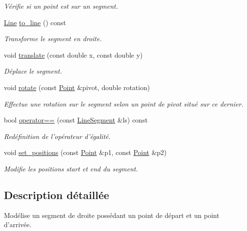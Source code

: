 \begin{DoxyCompactItemize}
\begin{DoxyCompactList}\small\item\em Vérifie si un point est sur un segment. \end{DoxyCompactList}\item 
\hyperlink{classLine}{Line} \hyperlink{classLineSegment_a0ca1dd12099a8629a67d5398f02e2529}{to\+\_\+line} () const 
\begin{DoxyCompactList}\small\item\em Transforme le segment en droite. \end{DoxyCompactList}\item 
void \hyperlink{classLineSegment_aedbd77b1d455613ea243fccfcdcf05fe}{translate} (const double x, const double y)
\begin{DoxyCompactList}\small\item\em Déplace le segment. \end{DoxyCompactList}\item 
void \hyperlink{classLineSegment_adf66b05ee5a1b034d8172848f9425943}{rotate} (const \hyperlink{classPoint}{Point} \&pivot, double rotation)
\begin{DoxyCompactList}\small\item\em Effectue une rotation sur le segment selon un point de pivot situé sur ce dernier. \end{DoxyCompactList}\item 
bool \hyperlink{classLineSegment_a74ef8c6e8a6c3c32250ae56cb76b23fe}{operator==} (const \hyperlink{classLineSegment}{Line\+Segment} \&ls) const 
\begin{DoxyCompactList}\small\item\em Redéfinition de l'opérateur d'égalité. \end{DoxyCompactList}\item 
void \hyperlink{classLineSegment_a8c10acc2f581a9c118069446bc37a56e}{set\+\_\+positions} (const \hyperlink{classPoint}{Point} \&p1, const \hyperlink{classPoint}{Point} \&p2)
\begin{DoxyCompactList}\small\item\em Modifie les positions start et end du segment. \end{DoxyCompactList}\end{DoxyCompactItemize}


\subsection{Description détaillée}
Modélise un segment de droite possédant un point de départ et un point d'arrivée. 

